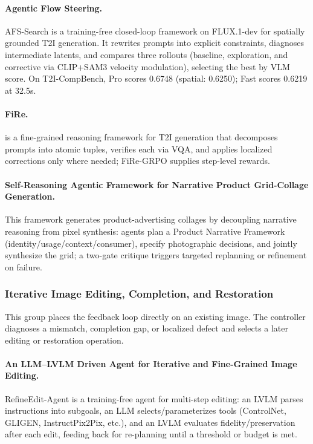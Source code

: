 \paragraph{Agentic Flow Steering.}
AFS-Search is a training-free closed-loop framework on FLUX.1-dev for spatially grounded T2I generation. It rewrites prompts into explicit constraints, diagnoses intermediate latents, and compares three rollouts (baseline, exploration, and corrective via CLIP+SAM3 velocity modulation), selecting the best by VLM score. On T2I-CompBench, Pro scores 0.6748 (spatial: 0.6250); Fast scores 0.6219 at 32.5s. ~\cite{avg260318627}

\paragraph{FiRe.}
 is a fine-grained reasoning framework for T2I generation that decomposes prompts into atomic tuples, verifies each via VQA, and applies localized corrections only where needed; FiRe-GRPO supplies step-level rewards. ~\cite{kim2026fire}

\paragraph{Self-Reasoning Agentic Framework for Narrative Product Grid-Collage Generation.}
This framework generates product-advertising collages by decoupling narrative reasoning from pixel synthesis: agents plan a Product Narrative Framework (identity/usage/context/consumer), specify photographic decisions, and jointly synthesize the grid; a two-gate critique triggers targeted replanning or refinement on failure.~\cite{avg260416958}

\subsubsection{Iterative Image Editing, Completion, and Restoration}
This group places the feedback loop directly on an existing image. The controller diagnoses a mismatch, completion gap, or localized defect and selects a later editing or restoration operation.

\paragraph{An LLM--LVLM Driven Agent for Iterative and Fine-Grained Image Editing.}
RefineEdit-Agent is a training-free agent for multi-step editing: an LVLM parses instructions into subgoals, an LLM selects/parameterizes tools (ControlNet, GLIGEN, InstructPix2Pix, etc.), and an LVLM evaluates fidelity/preservation after each edit, feeding back for re-planning until a threshold or budget is met. ~\cite{avg250817435}

